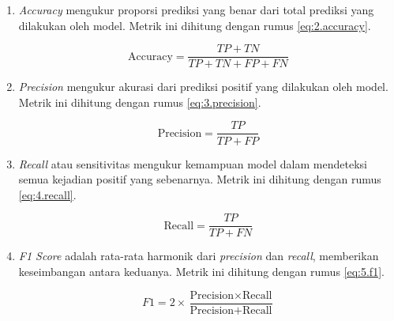 \begin{enumerate}
    \item \textit{Accuracy} mengukur proporsi prediksi yang benar dari total prediksi yang dilakukan oleh model. Metrik ini dihitung dengan rumus \ref{eq:2.accuracy}. \par
    \begin{equation}
        \text{Accuracy} = \frac{TP + TN}{TP + TN + FP + FN}
        \label{eq:2.accuracy}
    \end{equation}
    
    \item \textit{Precision} mengukur akurasi dari prediksi positif yang dilakukan oleh model. Metrik ini dihitung dengan rumus \ref{eq:3.precision}. \par
    \begin{equation}
        \text{Precision} = \frac{TP}{TP + FP}
        \label{eq:3.precision}
    \end{equation}
    
    \item \textit{Recall} atau sensitivitas mengukur kemampuan model dalam mendeteksi semua kejadian positif yang sebenarnya. Metrik ini dihitung dengan rumus \ref{eq:4.recall}. \par
    \begin{equation}
        \text{Recall} = \frac{TP}{TP + FN}
        \label{eq:4.recall}
    \end{equation}
    
    \item \textit{F1 Score} adalah rata-rata harmonik dari \textit{precision} dan \textit{recall}, memberikan keseimbangan antara keduanya. Metrik ini dihitung dengan rumus \ref{eq:5.f1}. \par
    \begin{equation}
        F1 = 2 \times \frac{\text{Precision} \times \text{Recall}}{\text{Precision} + \text{Recall}}
        \label{eq:5.f1}
    \end{equation}
\end{enumerate}